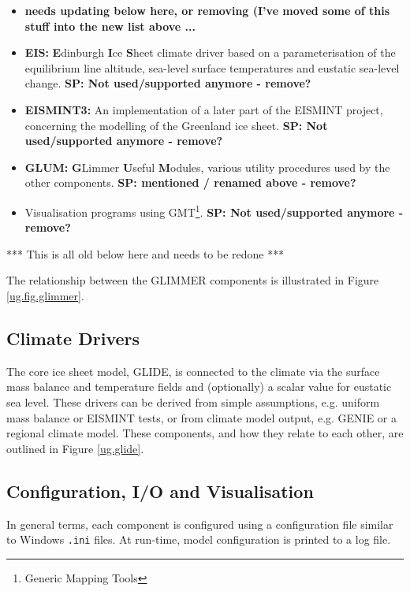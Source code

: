 \begin{itemize}
\item {\bf needs updating below here, or removing (I've moved some of this stuff into the new list above ...}
\item {\bf EIS:} {\bf E}dinburgh {\bf I}ce {\bf S}heet climate driver based on a parameterisation of the equilibrium line altitude, sea-level surface temperatures and eustatic sea-level change. \textbf{SP: Not used/supported anymore - remove?}
\item {\bf EISMINT3:} An implementation of a later part of the EISMINT project, concerning the modelling of the Greenland ice sheet. \textbf{SP: Not used/supported anymore - remove?}
\item {\bf GLUM:} {\bf G}Limmer {\bf U}seful {\bf M}odules, various utility procedures used by the other components. \textbf{SP: mentioned / renamed above - remove?}
\item Visualisation programs using GMT\footnote{Generic Mapping Tools}. \textbf{SP: Not used/supported anymore - remove?}
\end{itemize}
%
*** This is all old below here and needs to be redone ***

The relationship between the GLIMMER components is illustrated in Figure \ref{ug.fig.glimmer}. 
%
\subsection{Climate Drivers}
\label{subsec:climdrive}
The core ice sheet model, GLIDE, is connected to the climate via the surface mass balance and temperature fields and (optionally) a scalar value for eustatic sea level. These drivers can be derived from simple assumptions, e.g. uniform mass balance or EISMINT tests, or from climate model output, e.g. GENIE or a regional climate model. These components, and how they relate to each other, are outlined in Figure \ref{ug.glide}.
%
%
\subsection{Configuration, I/O and Visualisation}
In general terms, each component is configured using a configuration file similar to Windows \texttt{.ini} files. At run-time, model configuration is printed to a log file. 

